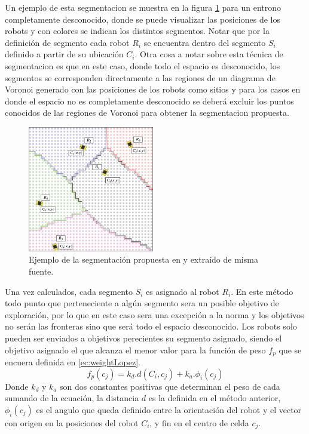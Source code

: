 Un ejemplo de esta segmentacion se muestra en la figura \ref{fig:ejemploCoordCenter} para un entrono completamente desconocido, donde se puede visualizar las posiciones de los robots y con colores se indican los distintos segmentos. Notar que por la definición de segmento cada robot $R_i$ se encuentra dentro del segmento $S_i$ definido a partir de su ubicación $C_i$. Otra cosa a notar sobre esta técnica de segmentacion es que en este caso, donde todo el espacio es desconocido, los segmentos se corresponden directamente a las regiones de un diagrama de Voronoi generado con las posiciones de los robots como sitios y para los casos en donde el espacio no es completamente desconocido se deberá excluir los puntos conocidos de las regiones de Voronoi para obtener la segmentacion propuesta.

\begin{figure}[H]
  \center
  \includegraphics[width=5.5cm]{imagenes/centerCoord.png}
  \caption{Ejemplo de la segmentación propuesta en \cite{Lopez-Perez2018} y extraído de misma fuente.}\label{fig:ejemploCoordCenter}
\end{figure} 

Una vez calculados, cada segmento $S_i$ es asignado al robot $R_i$. En este método todo punto que perteneciente a algún segmento sera un posible objetivo de exploración, por lo que en este caso sera una excepción a la norma y los objetivos no serán las fronteras sino que será todo el espacio desconocido. Los robots solo pueden ser enviados a objetivos perecientes su segmento asignado, siendo el objetivo asignado el que alcanza el menor valor para la función de peso $f_p$ que se encuera definida en \ref{ec:weightLopez}.
\begin{equation}\label{ec:weightLopez}
  f_p(c_j) = k_d.d(C_i,c_j) + k_a.\phi_i(c_j)
\end{equation}
Donde $k_d$ y $k_a$ son dos constantes positivas que determinan el peso de cada sumando de la ecuación, la distancia $d$ es la definida en el método anterior, $\phi_i(c_j)$ es el angulo que queda definido entre la orientación del robot y el vector con origen en la posiciones del robot $C_i$, y fin en el centro de celda $c_j$. 

